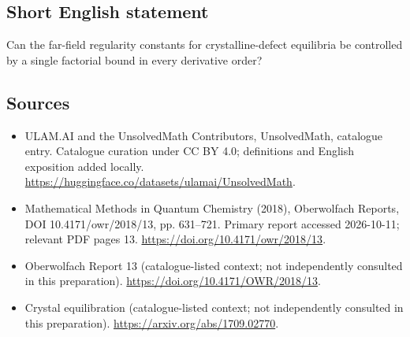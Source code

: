 \documentclass[11pt]{article}
\begin{document}
\subsection{Short English statement}
Can the far-field regularity constants for crystalline-defect equilibria be controlled by a single factorial bound in every derivative order?
\subsection{Sources}
\begin{itemize}
\item[\hypertarget{source:statement:1}{S1}] ULAM.AI and the UnsolvedMath Contributors, UnsolvedMath, catalogue entry. Catalogue curation under CC BY 4.0; definitions and English exposition added locally.
\url{https://huggingface.co/datasets/ulamai/UnsolvedMath}.
\item[\hypertarget{source:statement:2}{S2}] Mathematical Methods in Quantum Chemistry (2018), Oberwolfach Reports, DOI 10.4171/owr/2018/13, pp. 631--721. Primary report accessed 2026-10-11; relevant PDF pages 13.
\url{https://doi.org/10.4171/owr/2018/13}.
\item[\hypertarget{source:statement:3}{S3}] Oberwolfach Report 13 (catalogue-listed context; not independently consulted in this preparation).
\url{https://doi.org/10.4171/OWR/2018/13}.
\item[\hypertarget{source:statement:4}{S4}] Crystal equilibration (catalogue-listed context; not independently consulted in this preparation).
\url{https://arxiv.org/abs/1709.02770}.
\end{itemize}
\label{end:statement}
\end{document}
